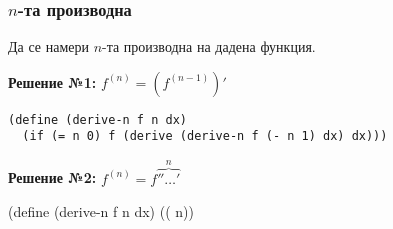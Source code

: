 \documentclass{beamer}
\begin{document}
\begin{frame}[fragile]
  \frametitle{$n$-та производна}

  Да се намери $n$-та производна на дадена функция.

  \vspace{1em}

  \pause

  \textbf{Решение №1:} $f^{(n)} = (f^{(n-1)})'$\pause
\begin{verbatim}
(define (derive-n f n dx)
  (if (= n 0) f (derive (derive-n f (- n 1) dx) dx)))
\end{verbatim}

  \pause

  \textbf{Решение №2:} $f^{(n)} = f\overbrace{''\ldots'}^n$\pause
\begin{semiverbatim}
(define (derive-n f n dx)
  ((  n))
\end{semiverbatim}
\end{frame}
\end{document}

